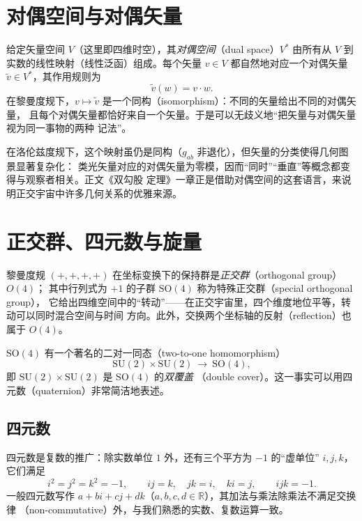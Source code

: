 \section{对偶空间与对偶矢量}

给定矢量空间 $V$（这里即四维时空），其\emph{对偶空间}（dual space）$V^*$ 由所有从 $V$ 到
实数的线性映射（线性泛函）组成。每个矢量 $v\in V$ 都自然地对应一个对偶矢量
$\tilde v\in V^*$，其作用规则为
\begin{equation}
\tilde v(w) = v\cdot w .
\end{equation}
在黎曼度规下，$v\mapsto \tilde v$ 是一个同构（isomorphism）：不同的矢量给出不同的对偶矢量，
且每个对偶矢量都恰好来自一个矢量。于是可以无歧义地“把矢量与对偶矢量视为同一事物的两种
记法”。

在洛伦兹度规下，这个映射虽仍是同构（$g_{ab}$ 非退化），但矢量的分类使得几何图景显著复杂化：
类光矢量对应的对偶矢量为零模，因而“同时”“垂直”等概念都变得与观察者相关。正文《双勾股
定理》一章正是借助对偶空间的这套语言，来说明正交宇宙中许多几何关系的优雅来源。

\section{正交群、四元数与旋量}

黎曼度规 $(+,+,+,+)$ 在坐标变换下的保持群是\emph{正交群}（orthogonal group）$O(4)$；
其中行列式为 $+1$ 的子群 $\mathrm{SO}(4)$ 称为特殊正交群（special orthogonal group），
它给出四维空间中的“转动”——在正交宇宙里，四个维度地位平等，转动可以同时混合空间与时间
方向。此外，交换两个坐标轴的反射（reflection）也属于 $O(4)$。

$\mathrm{SO}(4)$ 有一个著名的二对一同态（two-to-one homomorphism）
\begin{equation}
\mathrm{SU}(2)\times \mathrm{SU}(2)\ \longrightarrow\ \mathrm{SO}(4),
\tag{A.3}
\end{equation}
即 $\mathrm{SU}(2)\times \mathrm{SU}(2)$ 是 $\mathrm{SO}(4)$ 的\emph{双覆盖}
（double cover）。这一事实可以用四元数（quaternion）非常简洁地表述。

\subsection{四元数}

四元数是复数的推广：除实数单位 $1$ 外，还有三个平方为 $-1$ 的“虚单位” $i,j,k$，它们满足
\begin{equation}
i^{2}=j^{2}=k^{2}=-1,\qquad ij=k,\quad jk=i,\quad ki=j,\qquad ijk=-1 .
\end{equation}
一般四元数写作 $a+bi+cj+dk$（$a,b,c,d\in\mathbb{R}$），其加法与乘法除乘法不满足交换律
（non-commutative）外，与我们熟悉的实数、复数运算一致。

